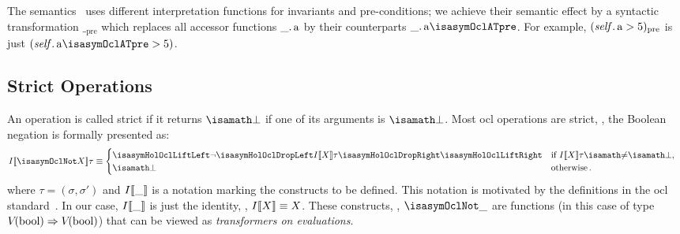 The \OCL semantics~\cite[Annex A]{omg:ocl:2003} uses different interpretation
functions for invariants and pre-conditions; we achieve their semantic effect by
a syntactic transformation $\__\text{pre}$ which replaces all accessor functions
$\getAttrib{\_}{a}$ by their counterparts
$\getAttrib{\_}{a\isasymOclATpre}$. For example, $(\getAttrib{\self}{a} >
5)_\text{pre}$ is just $(\getAttrib{\self}{a\isasymOclATpre} > 5)$.

\subsection{Strict Operations}%
\label{sec:strict-ops}%
\enlargethispage{1em}
An operation is called strict if it returns $\isasymbottom$ if one of its
arguments is $\isasymbottom$. Most \acs{ocl} operations are strict, \eg, the
Boolean negation is formally presented as:
\begin{align*}
I\semantics{\isasymOclNot X}\tau & \equiv
  \begin{cases}
    \lift{\lnot \drop{I\semantics{X} \tau}}
    &\text{if $I\semantics{X}\tau\isasymnoteq\isasymbottom$}, \\
     \isasymbottom & \text{otherwise}\,.
   \end{cases}
\end{align*}
where $\tau = (\sigma, \sigma')$ and $I\llbracket \_ \rrbracket$ is a notation marking the
\holocl constructs to be defined. This notation is motivated by the definitions
in the \acs{ocl} standard~\cite{omg:ocl:2003}. In our case, $I\llbracket \_ \rrbracket$ is
just the identity, \ie, $I\llbracket X \rrbracket\equiv X$.  These constructs, \ie,
$\isasymOclNot \_$ are \HOL functions (in this case of \HOL type
$V_{}({\mathrm{bool}}) \Rightarrow V_{}({\mathrm{bool}})$) that can be viewed as
\emph{transformers on evaluations}.

